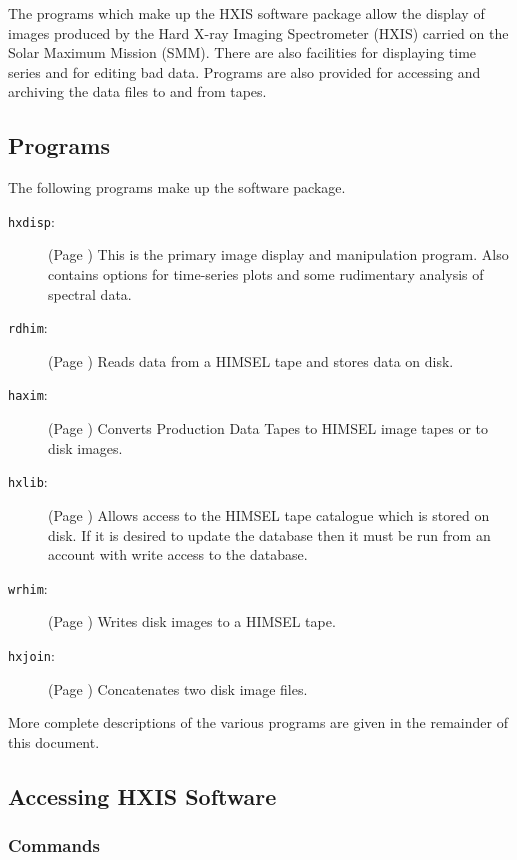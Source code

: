 The programs which make up the HXIS software package allow the display
of images produced by the Hard X-ray Imaging Spectrometer (HXIS)
carried on the Solar Maximum Mission (SMM). There are also facilities
for displaying time series and for editing bad data. Programs are also
provided for accessing and archiving the data files to and from tapes.

\subsection{Programs}      

The following programs make up the software package.

\begin{description} 
\item[\verb!hxdisp!: ] (Page \pageref{HXDISP}) This is the primary
image display and manipulation program. Also contains options for
time-series plots and some rudimentary analysis of spectral data.

\item[\verb!rdhim!: ]  (Page \pageref{RDHIM}) Reads data from a HIMSEL
tape and stores data on disk.

\item[\verb!haxim!: ] (Page \pageref{HAXIM}) Converts Production Data
Tapes to HIMSEL image tapes or to disk images.

\item[\verb!hxlib!: ] (Page \pageref{HXLIB}) Allows access to the HIMSEL tape
catalogue which is stored on disk. If it is desired to update the
database then it must be run from an account with write access to the
database.

\item[\verb!wrhim!: ] (Page \pageref{WRHIM}) Writes disk images to a
HIMSEL tape.

\item[\verb!hxjoin!: ] (Page \pageref{HXJOIN}) Concatenates two disk
image files.
\end{description}

More complete descriptions of the various programs are given in the
remainder of this document.

\subsection{Accessing HXIS Software}

\subsubsection{Commands}

